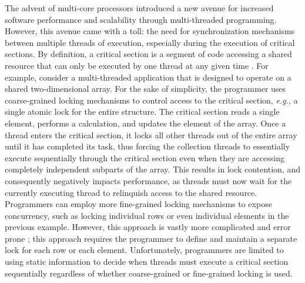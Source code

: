 \documentclass[11pt]{book}
\begin{document}
The advent of multi-core processors introduced a new avenue for increased software
performance and scalability through multi-threaded programming.  However, this avenue came
with a toll: the need for synchronization mechanisms between multiple threads of
execution, especially during the execution of critical sections.  By definition, a
critical section is a segment of code accessing a shared resource that can only be
executed by one thread at any given time \cite{os_concepts}.  For example, consider a
multi-threaded application that is designed to operate on a shared two-dimensional array.
For the sake of simplicity, the programmer uses coarse-grained locking mechanisms to
control access to the critical section, \emph{e.g.,} a single atomic lock for the entire
structure.  The critical section reads a single element, performs a calculation, and updates
the element of the array.  Once a thread enters the critical section, it locks all other
threads out of the entire array until it has completed its task, thus forcing the
collection threads to essentially execute sequentially through the critical section even
when they are accessing completely independent subparts of the array.  This results in
lock contention, and consequently negatively impacts performance, as threads must now wait
for the currently executing thread to relinquish access to the shared resource.
Programmers can employ more fine-grained locking mechanisms to expose concurrency, such as
locking individual rows or even individual elements in the previous example.  However,
this approach is vastly more complicated and error prone \cite{sle_rajwar}; this approach
requires the programmer to define and maintain a separate lock for each row or each
element.  Unfortunately, programmers are limited to using static information to 
decide when threads must execute a critical section sequentially regardless of whether
coarse-grained or fine-grained locking is used.


\end{document}
